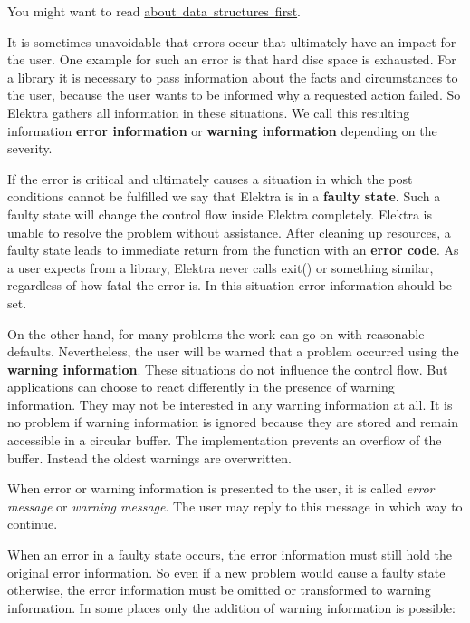 You might want to read \mbox{\hyperlink{doc_dev_data-structures_md}{about data structures first}}.

It is sometimes unavoidable that errors occur that ultimately have an impact for the user. One example for such an error is that hard disc space is exhausted. For a library it is necessary to pass information about the facts and circumstances to the user, because the user wants to be informed why a requested action failed. So Elektra gathers all information in these situations. We call this resulting information {\bfseries{error information}} or {\bfseries{warning information}} depending on the severity.

If the error is critical and ultimately causes a situation in which the post conditions cannot be fulfilled we say that Elektra is in a {\bfseries{faulty state}}. Such a faulty state will change the control flow inside Elektra completely. Elektra is unable to resolve the problem without assistance. After cleaning up resources, a faulty state leads to immediate return from the function with an {\bfseries{error code}}. As a user expects from a library, Elektra never calls {\ttfamily exit()} or something similar, regardless of how fatal the error is. In this situation error information should be set.

On the other hand, for many problems the work can go on with reasonable defaults. Nevertheless, the user will be warned that a problem occurred using the {\bfseries{warning information}}. These situations do not influence the control flow. But applications can choose to react differently in the presence of warning information. They may not be interested in any warning information at all. It is no problem if warning information is ignored because they are stored and remain accessible in a circular buffer. The implementation prevents an overflow of the buffer. Instead the oldest warnings are overwritten.

When error or warning information is presented to the user, it is called {\itshape error message} or {\itshape warning message}. The user may reply to this message in which way to continue.

When an error in a faulty state occurs, the error information must still hold the original error information. So even if a new problem would cause a faulty state otherwise, the error information must be omitted or transformed to warning information. In some places only the addition of warning information is possible\+:


